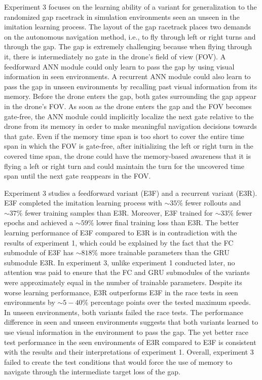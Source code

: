 Experiment 3 focuses on the learning ability of a variant for generalization 
to the randomized gap racetrack in simulation environments seen an unseen in the 
imitation learning process. The layout of the gap racetrack places two demands on 
the autonomous navigation method, i.e., to fly through left or right turns and through 
the gap. The gap is extremely challenging because when flying through it, there is 
intermediately no gate in the drone's field of view (FOV). A feedforward ANN module could 
only learn to pass the gap by using visual information in seen environments. A recurrent 
ANN module could also learn to pass the gap in unseen environments by recalling 
past visual information from its memory. Before the drone enters the gap, both gates 
surrounding the gap appear in the drone's FOV. As soon as the drone enters the gap and the 
FOV becomes gate-free, the ANN module could implicitly localize the next gate relative to the 
drone from its memory in order to make meaningful navigation decisions towards that gate. 
Even if the memory time span is too short to cover the entire time span in which the FOV is 
gate-free, after initializing the left or right turn in the covered time span, the drone could 
have the memory-based awareness that it is flying a left or right turn and 
could maintain the turn for the uncovered time span until the next gate reappears in the FOV. 

Experiment 3 studies a feedforward variant (E3F) and a recurrent variant (E3R).
E3F completed the imitation learning process
with $\sim 35\%$ fewer rollouts and $\sim 37\%$ fewer training samples than E3R.
Moreover, E3F
trained for $\sim 33\%$ fewer epochs and  
achieved a $\sim 59\%$ lower final training loss than E3R.
The better learning performance of E3F compared to E3R
is in contradiction with the results of experiment 1,
which could be explained by the fact
that the FC submodule of E3F has 
$\sim 818\%$ more trainable parameters than the GRU submodule E3R.
In experiment 3, unlike experiment 1 conducted later,
no attention was paid to ensure
that the FC and GRU submodules of the variants
were approximately equal in the number of trainable parameters.
Despite its worse learning performance,
E3R outperforms E3F in the race tests in seen environments
by $\sim 5 - 40\%$ percentage points over the tested maximum speeds.
In unseen environments,
both variants failed the race tests.
The performance difference in seen and unseen environments
suggests that both variants learned to use visual information in the environment to pass the gap.
The yet better race test performance in the seen environments of E3R compared to E3F
is consistent with the results and their interpretations of experiment 1.
Overall, experiment 3 failed to create the test conditions that would force the 
use of memory to navigate through the intermediate target loss of the gap.



